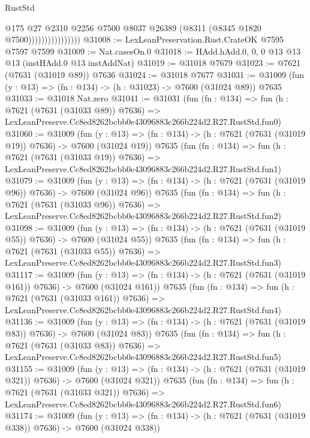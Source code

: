 \begin{lexlean}{RustStd}
\begin{coremodule}
                                @175
                                @27
                                @2310
                                @2256
                                @7500
                                @8037
                                @26389
                                (@8311 (@8345 @1820 @7500))))))))))))))))
@31008 := LexLeanPreservation.Rust.CrateOK @7595 @7597 @7599
@31009 := Nat.casesOn.{0}
@31018 := HAdd.hAdd.{0, 0, 0} @13 @13 @13 (instHAdd.{0} @13 instAddNat)
@31019 := @31018 @7679
@31023 := @7621 (@7631 (@31019 @89)) @7636
@31024 := @31018 @7677
@31031 := @31009 (fun (y : @13) => (fn : @134) -> (h : @31023) -> @7600 (@31024 @89)) @7635
@31033 := @31018 Nat.zero
@31041 := @31031
    (fun (fn : @134) =>
    fun (h : @7621 (@7631 (@31033 @89)) @7636) =>
    LexLeanPreserve.Cc8ed8262bcbb0e43096883c266b224d2.R27.RustStd.fun0)
@31060 := @31009
    (fun (y : @13) => (fn : @134) -> (h : @7621 (@7631 (@31019 @19)) @7636) -> @7600 (@31024 @19))
    @7635
    (fun (fn : @134) =>
    fun (h : @7621 (@7631 (@31033 @19)) @7636) =>
    LexLeanPreserve.Cc8ed8262bcbb0e43096883c266b224d2.R27.RustStd.fun1)
@31079 := @31009
    (fun (y : @13) => (fn : @134) -> (h : @7621 (@7631 (@31019 @96)) @7636) -> @7600 (@31024 @96))
    @7635
    (fun (fn : @134) =>
    fun (h : @7621 (@7631 (@31033 @96)) @7636) =>
    LexLeanPreserve.Cc8ed8262bcbb0e43096883c266b224d2.R27.RustStd.fun2)
@31098 := @31009
    (fun (y : @13) => (fn : @134) -> (h : @7621 (@7631 (@31019 @55)) @7636) -> @7600 (@31024 @55))
    @7635
    (fun (fn : @134) =>
    fun (h : @7621 (@7631 (@31033 @55)) @7636) =>
    LexLeanPreserve.Cc8ed8262bcbb0e43096883c266b224d2.R27.RustStd.fun3)
@31117 := @31009
    (fun (y : @13) => (fn : @134) -> (h : @7621 (@7631 (@31019 @161)) @7636) -> @7600 (@31024 @161))
    @7635
    (fun (fn : @134) =>
    fun (h : @7621 (@7631 (@31033 @161)) @7636) =>
    LexLeanPreserve.Cc8ed8262bcbb0e43096883c266b224d2.R27.RustStd.fun4)
@31136 := @31009
    (fun (y : @13) => (fn : @134) -> (h : @7621 (@7631 (@31019 @83)) @7636) -> @7600 (@31024 @83))
    @7635
    (fun (fn : @134) =>
    fun (h : @7621 (@7631 (@31033 @83)) @7636) =>
    LexLeanPreserve.Cc8ed8262bcbb0e43096883c266b224d2.R27.RustStd.fun5)
@31155 := @31009
    (fun (y : @13) => (fn : @134) -> (h : @7621 (@7631 (@31019 @321)) @7636) -> @7600 (@31024 @321))
    @7635
    (fun (fn : @134) =>
    fun (h : @7621 (@7631 (@31033 @321)) @7636) =>
    LexLeanPreserve.Cc8ed8262bcbb0e43096883c266b224d2.R27.RustStd.fun6)
@31174 := @31009
    (fun (y : @13) => (fn : @134) -> (h : @7621 (@7631 (@31019 @338)) @7636) -> @7600 (@31024 @338))

\end{coremodule}
\end{lexlean}
